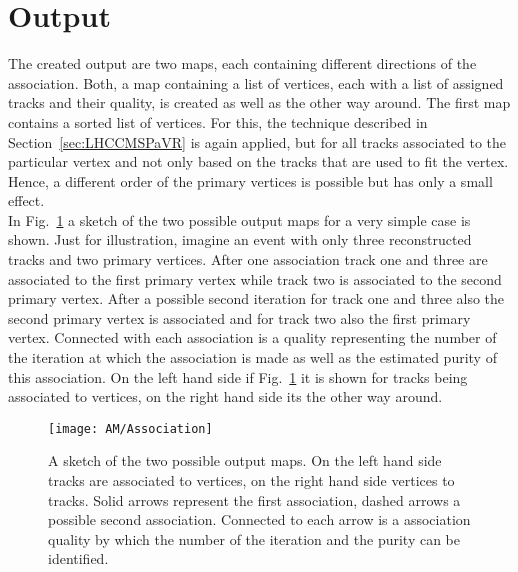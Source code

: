 \section{Output\label{sec:AMOutput}}

The created output are two maps, each containing different directions of the association. Both, a map containing a list of vertices, each with a list of assigned tracks and their quality, is created as well as the other way around. The first map contains a sorted list of vertices. For this, the technique described in Section~\ref{sec:LHCCMSPaVR} is again applied, but for all tracks associated to the particular vertex and not only based on the tracks that are used to fit the vertex. Hence, a different order of the primary vertices is possible but has only a small effect.\\
In Fig.~\ref{plot:AMOutput} a sketch of the two possible output maps for a very simple case is shown. Just for illustration, imagine an event with only three reconstructed tracks and two primary vertices. After one association track one and three are associated to the first primary vertex while track two is associated to the second primary vertex. After a possible second iteration for track one and three also the second primary vertex is associated and for track two also the first primary vertex. Connected with each association is a quality representing the number of the iteration at which the association is made as well as the estimated purity of this association. On the left hand side if Fig.~\ref{plot:AMOutput} it is shown for tracks being associated to vertices, on the right hand side its the other way around.

\begin{figure}[!ht]
    \centering
    \texttt{[image: AM/Association]}
    \caption[Sketch of the two different output maps]{A sketch of the two possible output maps. On the left hand side tracks are associated to vertices, on the right hand side vertices to tracks. Solid arrows represent the first association, dashed arrows a possible second association. Connected to each arrow is a association quality by which the number of the iteration and the purity can be identified. \label{plot:AMOutput}}
\end{figure}
